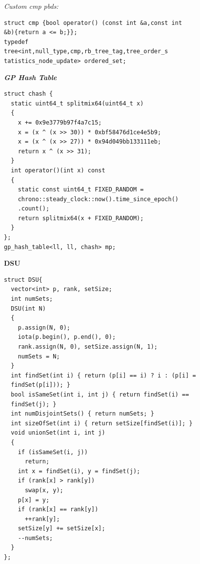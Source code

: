 \switchcolumn

\textit{Custom cmp pbds:}

\begin{lstlisting}
struct cmp {bool operator() (const int &a,const int
&b){return a <= b;}};
typedef
tree<int,null_type,cmp,rb_tree_tag,tree_order_s
tatistics_node_update> ordered_set;
\end{lstlisting}

\switchcolumn

\switchcolumn

\textbf{\textit{GP Hash Table}}
\begin{lstlisting}
struct chash {
  static uint64_t splitmix64(uint64_t x)
  {
    x += 0x9e3779b97f4a7c15;
    x = (x ^ (x >> 30)) * 0xbf58476d1ce4e5b9;
    x = (x ^ (x >> 27)) * 0x94d049bb133111eb;
    return x ^ (x >> 31);
  }
  int operator()(int x) const
  {
    static const uint64_t FIXED_RANDOM =
    chrono::steady_clock::now().time_since_epoch()
    .count();
    return splitmix64(x + FIXED_RANDOM);
  }
};
gp_hash_table<ll, ll, chash> mp;
\end{lstlisting}

\textbf{DSU}
\begin{lstlisting}
struct DSU{
  vector<int> p, rank, setSize;
  int numSets;
  DSU(int N)
  {
    p.assign(N, 0);
    iota(p.begin(), p.end(), 0);
    rank.assign(N, 0), setSize.assign(N, 1);
    numSets = N;
  }
  int findSet(int i) { return (p[i] == i) ? i : (p[i] =
  findSet(p[i])); }
  bool isSameSet(int i, int j) { return findSet(i) ==
  findSet(j); }
  int numDisjointSets() { return numSets; }
  int sizeOfSet(int i) { return setSize[findSet(i)]; }
  void unionSet(int i, int j)
  {
    if (isSameSet(i, j))
      return;
    int x = findSet(i), y = findSet(j);
    if (rank[x] > rank[y])
      swap(x, y);
    p[x] = y;
    if (rank[x] == rank[y])
      ++rank[y];
    setSize[y] += setSize[x];
    --numSets;
  }
};
\end{lstlisting}

\switchcolumn


